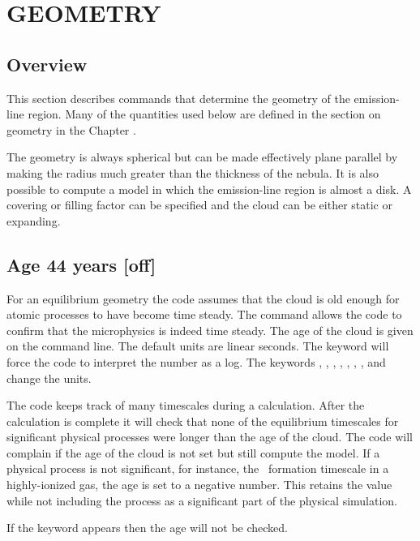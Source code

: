 \chapter{GEOMETRY}

\section{Overview}

This section describes commands that determine the geometry of the
emission-line region.
Many of the quantities used below are defined in
the section on geometry in the Chapter .

The geometry is always spherical but can be made effectively plane
parallel by making the radius much greater than the
thickness of the nebula.
It is also possible to compute a model in which the emission-line region
is almost a disk.
A covering or filling factor can be specified and the
cloud can be either static or expanding.

\section{Age 44 years [off]}

For an equilibrium geometry the code assumes that the cloud is old enough for
atomic processes to have become time steady.
The  command allows the
code to confirm that the microphysics is indeed time steady.
The age of
the cloud is given on the command line.
The default units are linear
seconds.
The keyword  will force the code to interpret the number as
a log.
The keywords , , ,
, , ,
, and  change the units.

The code keeps track of many timescales during a calculation.
After the calculation is complete it will check that none of the
equilibrium timescales for significant physical processes
were longer than the age of the cloud.
The code will complain if the age of the cloud is not set but
still compute the model.
If a physical process is not significant, for
instance, the \htwo\ formation timescale in a highly-ionized gas,
the age is
set to a negative number.
This retains the value while not including the
process as a significant part of the physical simulation.

If the keyword  appears then the age will not be checked.

